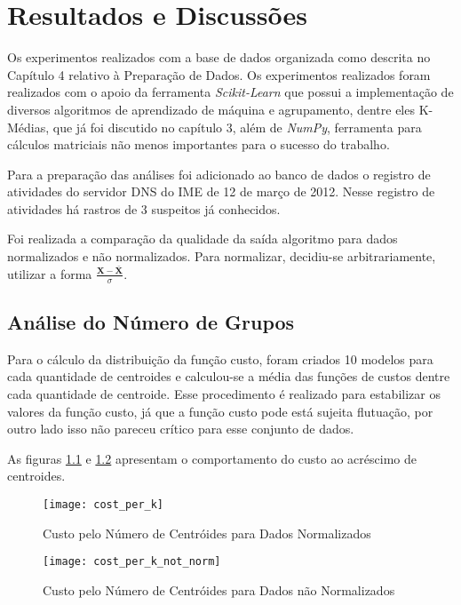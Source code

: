 \chapter{Resultados e Discussões}

Os experimentos realizados com a base de dados organizada como descrita no Capítulo 4 relativo à Preparação de Dados. Os experimentos realizados foram realizados com o apoio da ferramenta \textit{Scikit-Learn} que possui a implementação de diversos algoritmos de aprendizado de máquina e agrupamento, dentre eles K-Médias, que já foi discutido no capítulo 3, além de \textit{NumPy}, ferramenta para cálculos matriciais não menos importantes para o sucesso do trabalho.

Para a preparação das análises foi adicionado ao banco de dados o registro de atividades do servidor DNS do IME de 12 de março de 2012. Nesse registro de atividades há rastros de 3 suspeitos já conhecidos.

Foi realizada a comparação da qualidade da saída algoritmo para dados normalizados e não normalizados. Para normalizar, decidiu-se arbitrariamente, utilizar a forma \(\frac{\mathbf{X} - \mathbf{\bar{X}}}{\sigma} \).

\section{Análise do Número de Grupos}

Para o cálculo da distribuição da função custo, foram criados 10 modelos para cada quantidade de centroides e calculou-se a média das funções de custos dentre cada quantidade de centroide. Esse procedimento é realizado para estabilizar os valores da função custo, já que a função custo pode está sujeita flutuação, por outro lado isso não pareceu crítico para esse conjunto de dados.

As figuras \ref{fig:cost_per_k} e \ref{fig:cost_per_k_not_norm} apresentam o comportamento do custo ao acréscimo de centroides.

\begin{figure}[htbp]
\centering
\texttt{[image: cost\_per\_k]}
\caption[Custo pelo Número de Centróides para Dados Normalizados]{Custo pelo Número de Centróides para Dados Normalizados} \label{fig:cost_per_k}
\end{figure}

\begin{figure}[htbp]
\centering
\texttt{[image: cost\_per\_k\_not\_norm]}
\caption[Custo pelo Número de Centróides para Dados não Normalizados]{Custo pelo Número de Centróides para Dados não Normalizados} \label{fig:cost_per_k_not_norm}
\end{figure}

